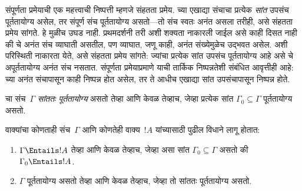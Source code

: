 \documentclass[../../../include/open-logic-section]{subfiles}
\begin{document}
      {}
      {}


संपूर्णता प्रमेयाची एक महत्त्वाची निष्पत्ती म्हणजे संहतता प्रमेय.
च्या एखाद्या संचाचा प्रत्येक \emph{सांत} उपसंच पूर्ततायोग्य असेल,
तर संपूर्ण संच पूर्ततायोग्य असतो---तो संच स्वतः अनंत असला तरीही, असे
संहतता प्रमेय सांगते. हे मुळीच उघड नाही. प्रथमदर्शनी तरी अशी शक्यता
नाकारली जाईल असे काही दिसत नाही की चे अनंत संच व्याघाती
असतील, पण व्याघात, जणू काही, अनंत संख्येमुळेच उद्भवत असेल. अशी परिस्थिती
नाकारता येते, असे संहतता प्रमेय सांगते: ज्यांचा प्रत्येक सांत उपसंच
पूर्ततायोग्य आहे असे चे अपूर्ततायोग्य अनंत संच नसतात.
संपूर्णता प्रमेयाप्रमाणे याची तार्किक निष्पन्नतेशी संबंधित आवृत्तीही आहे:
च्या अनंत संचापासून काही निष्पन्न होत असेल, तर ते आधीच
एखाद्या सांत उपसंचापासून निष्पन्न होते.

\begin{defn}
  चा संच~$\Gamma$ \emph{सांततः पूर्ततायोग्य} असतो तेव्हा आणि
  केवळ तेव्हाच, जेव्हा प्रत्येक सांत $\Gamma_0 \subseteq \Gamma$
  पूर्ततायोग्य असतो.
\end{defn}

\begin{thm}[संहतता प्रमेय]
वाक्यांचा कोणताही संच~$\Gamma$ आणि कोणतेही वाक्य~$!A$ यांच्यासाठी पुढील
विधाने लागू होतात:
\begin{enumerate}
  \item $\Gamma \Entails !A$ तेव्हा आणि केवळ तेव्हाच, जेव्हा असा सांत
    $\Gamma_0 \subseteq \Gamma$ असतो की $\Gamma_0 \Entails !A$.
  \item $\Gamma$ पूर्ततायोग्य असतो तेव्हा आणि केवळ तेव्हाच, जेव्हा तो
    सांततः पूर्ततायोग्य असतो.
\end{enumerate}
\end{thm}
\end{document}
